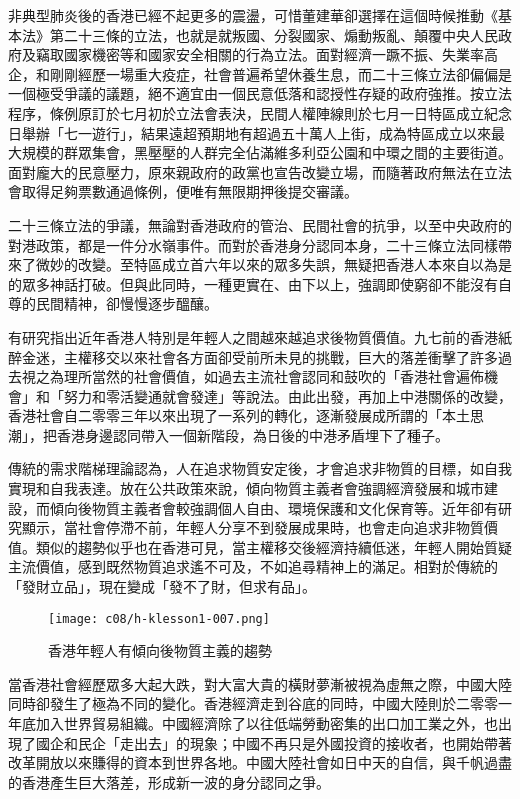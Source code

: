 非典型肺炎後的香港已經不起更多的震盪，可惜董建華卻選擇在這個時候推動《基本法》第二十三條的立法，也就是就叛國、分裂國家、煽動叛亂、顛覆中央人民政府及竊取國家機密等和國家安全相關的行為立法。面對經濟一蹶不振、失業率高企，和剛剛經歷一場重大疫症，社會普遍希望休養生息，而二十三條立法卻偏偏是一個極受爭議的議題，絕不適宜由一個民意低落和認授性存疑的政府強推。按立法程序，條例原訂於七月初於立法會表決，民間人權陣線則於七月一日特區成立紀念日舉辦「七一遊行」，結果遠超預期地有超過五十萬人上街，成為特區成立以來最大規模的群眾集會，黑壓壓的人群完全佔滿維多利亞公園和中環之間的主要街道。面對龐大的民意壓力，原來親政府的政黨也宣告改變立場，而隨著政府無法在立法會取得足夠票數通過條例，便唯有無限期押後提交審議。

二十三條立法的爭議，無論對香港政府的管治、民間社會的抗爭，以至中央政府的對港政策，都是一件分水嶺事件。而對於香港身分認同本身，二十三條立法同樣帶來了微妙的改變。至特區成立首六年以來的眾多失誤，無疑把香港人本來自以為是的眾多神話打破。但與此同時，一種更實在、由下以上，強調即使窮卻不能沒有自尊的民間精神，卻慢慢逐步醞釀。

有研究指出近年香港人特別是年輕人之間越來越追求後物質價值。九七前的香港紙醉金迷，主權移交以來社會各方面卻受前所未見的挑戰，巨大的落差衝擊了許多過去視之為理所當然的社會價值，如過去主流社會認同和鼓吹的「香港社會遍佈機會」和「努力和零活變通就會發達」等說法。由此出發，再加上中港關係的改變，香港社會自二零零三年以來出現了一系列的轉化，逐漸發展成所謂的「本土思潮」，把香港身邊認同帶入一個新階段，為日後的中港矛盾埋下了種子。

傳統的需求階梯理論認為，人在追求物質安定後，才會追求非物質的目標，如自我實現和自我表達。放在公共政策來說，傾向物質主義者會強調經濟發展和城市建設，而傾向後物質主義者會較強調個人自由、環境保護和文化保育等。近年卻有研究顯示，當社會停滯不前，年輕人分享不到發展成果時，也會走向追求非物質價值。類似的趨勢似乎也在香港可見，當主權移交後經濟持續低迷，年輕人開始質疑主流價值，感到既然物質追求遙不可及，不如追尋精神上的滿足。相對於傳統的「發財立品」，現在變成「發不了財，但求有品」。

\begin{figure}[htbp]
    \centering
    \texttt{[image: c08/h-klesson1-007.png]}
    \caption{香港年輕人有傾向後物質主義的趨勢} 
\end{figure}

當香港社會經歷眾多大起大跌，對大富大貴的橫財夢漸被視為虛無之際，中國大陸同時卻發生了極為不同的變化。香港經濟走到谷底的同時，中國大陸則於二零零一年底加入世界貿易組織。中國經濟除了以往低端勞動密集的出口加工業之外，也出現了國企和民企「走出去」的現象；中國不再只是外國投資的接收者，也開始帶著改革開放以來賺得的資本到世界各地。中國大陸社會如日中天的自信，與千帆過盡的香港產生巨大落差，形成新一波的身分認同之爭。

